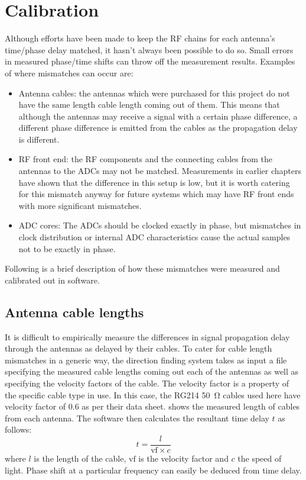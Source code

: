 \section{Calibration}


Although efforts have been made to keep the RF chains for each antenna's time/phase delay matched, it hasn't always been possible to do so. Small errors in measured phase/time shifts can throw off the measurement results. Examples of where mismatches can occur are:

\begin{itemize}
  \item Antenna cables: the antennas which were purchased for this project do not have the same length cable length coming out of them. This means that although the antennas may receive a signal with a certain phase difference, a different phase difference is emitted from the cables as the propagation delay is different.
  \item RF front end: the RF components and the connecting cables from the antennas to the ADCs may not be matched. Measurements in earlier chapters have shown that the difference in this setup is low, but it is worth catering for this mismatch anyway for future systems which may have RF front ends with more significant mismatches.
  \item ADC cores: The ADCs should be clocked exactly in phase, but mismatches in clock distribution or internal ADC characteristics cause the actual samples not to be exactly in phase.
\end{itemize}

Following is a brief description of how these mismatches were measured and calibrated out in software.

\subsection{Antenna cable lengths}
It is difficult to empirically measure the differences in signal propagation delay through the antennas as delayed by their cables. To cater for cable length mismatches in a generic way, the direction finding system takes as input a file specifying the measured cable lengths coming out each of the antennas as well as specifying the velocity factors of the cable. The velocity factor is a property of the specific cable type in use. In this case, the RG214 \SI{50}{\ohm} cables used here have velocity factor of 0.6 as per their data sheet.  shows the measured length of cables from each antenna. The software then calculates the resultant time delay \(t\) as follows:
\begin{equation}
    t = \frac{l}{\text{vf} \times c}
\end{equation}
where \(l\) is the length of the cable, \(\text{vf}\) is the velocity factor and \(c\) the speed of light. Phase shift at a particular frequency can easily be deduced from time delay.

